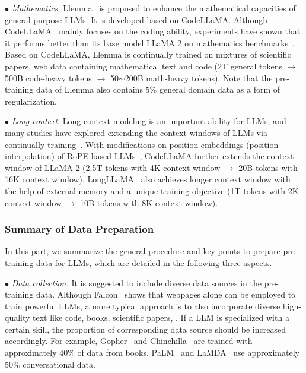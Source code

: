 {{
$\bullet$ \emph{Mathematics.} Llemma~\cite{Azerbayev-arxiv-2023-llemma} is proposed to enhance the mathematical capacities of general-purpose LLMs.
It is developed based on CodeLLaMA. 
Although CodeLLaMA~\cite{Roziere-arxiv-2023-codellama} mainly focuses on the coding ability, experiments have shown that it performs better than its base model LLaMA 2 on mathematics benchmarks~\cite{Azerbayev-arxiv-2023-llemma}. %
Based on CodeLLaMA, Llemma is continually trained on mixtures of scientific papers, web data containing mathematical text and  code (2T general tokens $\rightarrow$ 500B code-heavy tokens $\rightarrow$ 50$\sim$200B math-heavy tokens). Note that the pre-training data of Llemma also contains 5\% general domain data as a form of regularization.
}

{
$\bullet$ \emph{Long context}. Long context modeling is an important ability for LLMs, and  many studies have explored extending the  context windows of LLMs via continually training~\cite{Roziere-arxiv-2023-codellama,Tworkowski-arxiv-2023-Focused}. With modifications on position embeddings (\ie  position interpolation) of RoPE-based LLMs~\cite{Touvron-2023-llama2-arxiv,Touvron-arxiv-2023-LLaMA,Chen-arxiv-2023-Extending}, 
CodeLLaMA further extends the context window of LLaMA 2 (2.5T tokens with 4K context window $\rightarrow$ 20B tokens with 16K context window).
LongLLaMA~\cite{Tworkowski-arxiv-2023-Focused} also achieves longer context window 
with the help of external memory and a unique training objective (1T tokens with 2K context window $\rightarrow$ 10B tokens with 8K context window).
}








%

{
\subsubsection{Summary of Data Preparation}
\label{sec:data_prepare_sug}
In this part, we summarize the general procedure and key points  to prepare pre-training data for LLMs, which are  detailed in the following three aspects.    
}

{
$\bullet$ \emph{Data collection.} It is suggested to include  diverse data sources in  the pre-training data.  Although Falcon~\cite{Penedo-2023-arxiv-Refinedweb} shows that webpages alone can be employed to train powerful LLMs, a more typical approach is to also incorporate  diverse high-quality text like code, books, scientific papers, \etc.
If a LLM is specialized with a certain skill, the proportion of corresponding data source should be increased accordingly.  %
For example, Gopher~\cite{Rae-arxiv-2021-Scaling} and Chinchilla~\cite{Hoffmann-arxiv-2022-Training} are trained with approximately 40\% of data from books. PaLM~\cite{driess-arxiv-2023-palm} and LaMDA~\cite{Thoppilan-CoRR-2022-LaMDA} use  approximately 50\% conversational data.
}

}
